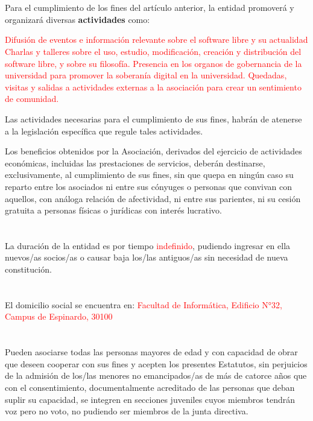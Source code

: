 \documentclass[draft]{estatutos}
\begin{document}
\begin{linenumbers}[1]
  \section{}
  Para el cumplimiento de los fines del artículo anterior, la entidad promoverá
  y organizará diversas \textbf{actividades} como:

\textcolor{red}{
  \begin{enumerate}
  \sub Difusión de eventos e información relevante sobre el software libre y su
  actualidad
  \sub Charlas y talleres sobre el uso, estudio, modificación, creación y
  distribución del software libre, y sobre su filosofía.
  \sub Presencia en los organos de gobernancia de la universidad para promover
  la soberanía digital en la universidad.
  \sub Quedadas, visitas y salidas a actividades externas a la asociación para
      crear un sentimiento de comunidad.
  \end{enumerate}
}

  Las actividades necesarias para el cumplimiento de sus fines, habrán de
  atenerse a la legislación específica que regule tales actividades.

  Los beneficios obtenidos por la Asociación, derivados del ejercicio de
  actividades económicas, incluidas las prestaciones de servicios, deberán
  destinarse, exclusivamente, al cumplimiento de sus fines, sin que quepa en
  ningún caso su reparto entre los asociados ni entre sus cónyuges o personas
  que convivan con aquellos, con análoga relación de afectividad, ni entre sus
  parientes, ni su cesión gratuita a personas físicas o jurídicas con interés
  lucrativo.

  \section{}
  La duración de la entidad es por tiempo \textcolor{red}{indefinido}, pudiendo ingresar en ella
  nuevos/as socios/as o causar baja los/las antiguos/as sin necesidad de nueva
  constitución.

  \section{}
  El domicilio social se encuentra en: \textcolor{red}{Facultad de Informática,
  Edificio N°32, Campus de Espinardo, 30100}


  \section{}
  Pueden asociarse todas las personas mayores de edad y con capacidad de obrar
  que deseen cooperar con sus fines y acepten los presentes Estatutos, sin
  perjuicios de la admisión de los/las menores no emancipados/as de más de
  catorce años que con el consentimiento, documentalmente acreditado de las
  personas que deban suplir su capacidad, se integren en secciones juveniles
  cuyos miembros tendrán voz pero no voto, no pudiendo ser miembros de la junta
  directiva.


\end{linenumbers}
\end{document}
